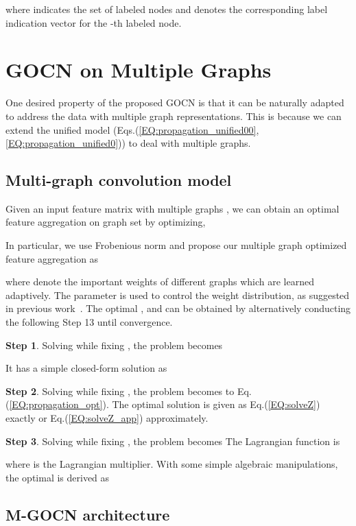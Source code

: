 \documentclass{article}
\begin{document}
where  indicates the set of labeled nodes and  denotes the corresponding label indication vector for the -th labeled node. 



\section{GOCN on Multiple Graphs}

One desired property of the proposed GOCN is that it  can be naturally adapted to address  the data with multiple graph representations.
This is because we can extend the unified model  (Eqs.(\ref{EQ:propagation_unified00},\ref{EQ:propagation_unified0})) to deal with multiple graphs.

\subsection{Multi-graph convolution model}

Given an input feature matrix  with multiple graphs , we can obtain an optimal feature aggregation  on graph set  by optimizing,

In particular, we use Frobenious norm and propose our multiple graph optimized feature aggregation as

where 
denote the important weights of different graphs which are learned adaptively.
The parameter  is used to control the weight distribution, as
suggested in previous work~\cite{xia2010multiview}.
The optimal ,  and  can be obtained by alternatively conducting the following {Step 13} until convergence.

\noindent \textbf{Step 1}. Solving  while fixing , the problem becomes

It has a simple closed-form solution  as 

\noindent \textbf{Step 2}. Solving  while fixing , the problem becomes to Eq.(\ref{EQ:propagation_opt}).
The optimal solution is given as Eq.(\ref{EQ:solveZ}) exactly or Eq.(\ref{EQ:solveZ_app}) approximately.

\noindent \textbf{Step 3}. Solving  while fixing , the problem becomes
\label{EQ:solveZ0}
The Lagrangian function is

where   is the Lagrangian multiplier.
With some simple algebraic manipulations, the optimal  is derived as


\subsection{M-GOCN architecture}
\end{document}
